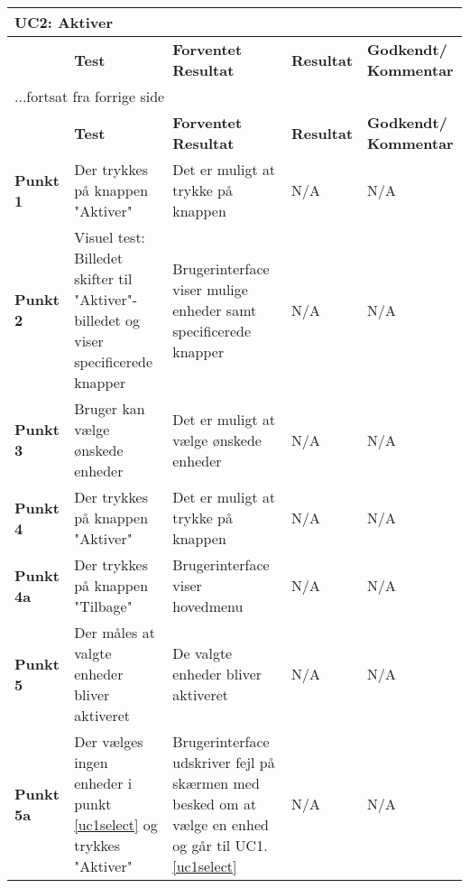 
\begin{center}
\begin{longtable}{|p{}|p{}|p{3cm}|p{3cm}|p{3cm}|} %
\hline
\multicolumn{5}{|l|}{\textbf{UC2: Aktiver}} \\ \hline
\multicolumn{1}{|c|}{} &
\textbf{Test} &
\textbf{Forventet \newline Resultat} &
\textbf{Resultat} &
\textbf{Godkendt/ \newline Kommentar} \\ \hline 
\endfirsthead

\multicolumn{5}{l}{...fortsat fra forrige side} \\ \hline 
\multicolumn{1}{|c|}{} &
\textbf{Test} &
\textbf{Forventet \newline Resultat} &
\textbf{Resultat} &
\textbf{Godkendt/ \newline Kommentar} \\ \hline 
\endhead


\textbf{Punkt 1}		&Der trykkes på knappen "Aktiver"	&Det er muligt at trykke på knappen				&N/A &N/A \\\hline
		
\textbf{Punkt 2}		&Visuel test: Billedet skifter til "Aktiver"-billedet og viser specificerede knapper																	&Brugerinterface viser mulige enheder samt specificerede knapper 																																						&N/A &N/A \\\hline
		
\textbf{Punkt 3}		&Bruger kan vælge ønskede enheder		& Det er muligt at vælge ønskede enheder 	&N/A &N/A \\\hline
		
\textbf{Punkt 4}		&Der trykkes på knappen "Aktiver"		& Det er muligt at trykke på knappen		 	&N/A &N/A \\\hline

\textbf{Punkt 4a}	&Der trykkes på knappen "Tilbage"		& Brugerinterface viser hovedmenu
																										&N/A &N/A \\\hline

\textbf{Punkt 5}		&Der måles at valgte enheder bliver aktiveret				
					&De valgte enheder bliver aktiveret &N/A &N/A \\\hline
															
\textbf{Punkt 5a}	&Der vælges ingen enheder i punkt \ref{uc1select} og trykkes "Aktiver"				
					&Brugerinterface udskriver fejl på skærmen med besked om at vælge en enhed og går til UC1.\ref{uc1select}																												&N/A &N/A \\\hline
		

\end{longtable}
\end{center}
